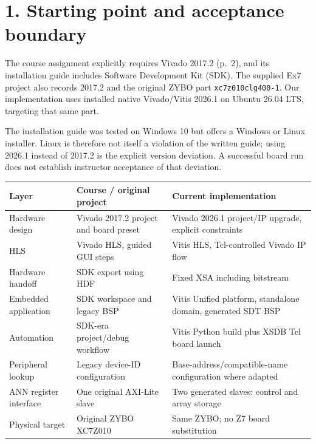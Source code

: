\documentclass[11pt,a4paper]{article}
\begin{document}


\section*{1. Starting point and acceptance boundary}
The course assignment explicitly requires Vivado 2017.2 (p.~2), and its
installation guide includes Software Development Kit (SDK). The supplied
Ex7 project also records 2017.2 and the original ZYBO part
\texttt{xc7z010clg400-1}. Our implementation uses installed native
Vivado/Vitis 2026.1 on Ubuntu 26.04 LTS, targeting that same part.

The installation guide was tested on Windows 10 but offers a Windows or Linux
installer. Linux is therefore not itself a violation of the written guide;
using 2026.1 instead of 2017.2 is the explicit version deviation. A successful
board run does not establish instructor acceptance of that deviation.

\begin{tabularx}{\linewidth}{P{3.15cm} Y Y}
\toprule Layer & Course / original project & Current implementation \\
\midrule
Hardware design & Vivado 2017.2 project and board preset & Vivado 2026.1 project/IP upgrade, explicit constraints \\
HLS & Vivado HLS, guided GUI steps & Vitis HLS, Tcl-controlled Vivado IP flow \\
Hardware handoff & SDK export using HDF & Fixed XSA including bitstream \\
Embedded application & SDK workspace and legacy BSP & Vitis Unified platform, standalone domain, generated SDT BSP \\
Automation & SDK-era project/debug workflow & Vitis Python build plus XSDB Tcl board launch \\
Peripheral lookup & Legacy device-ID configuration & Base-address/compatible-name configuration where adapted \\
ANN register interface & One original AXI-Lite slave & Two generated slaves: control and array storage \\
Physical target & Original ZYBO XC7Z010 & Same ZYBO; no Z7 board substitution \\
\bottomrule
\end{tabularx}
\end{document}
